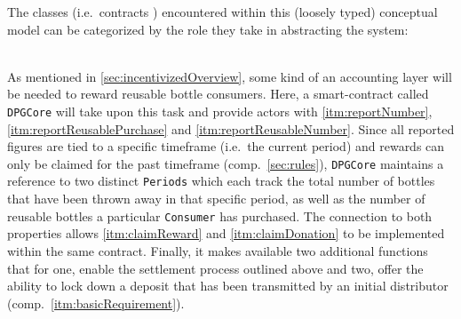 The classes (i.e.~contracts \cite[p.~75]{solidityDocs}) encountered within this (loosely typed) conceptual model can be categorized by the role they take in abstracting the system:

\begin{description}[format={\storedescriptionlabel}]
	\item[Accounting\label{itm:accounting}]
	\hfill \\
	As mentioned in \autoref{sec:incentivizedOverview}, some kind of an accounting layer will be needed to reward reusable bottle consumers. Here, a smart-contract called \texttt{DPGCore} will take upon this task and provide actors with \ref{itm:reportNumber}, \ref{itm:reportReusablePurchase} and \ref{itm:reportReusableNumber}. Since all reported figures are tied to a specific timeframe (i.e.~the current period) and rewards can only be claimed for the past timeframe (comp.~\ref{sec:rules}), \texttt{DPGCore} maintains a reference to two distinct \texttt{Periods} which each track the total number of bottles that have been thrown away in that specific period, as well as the number of reusable bottles a particular \texttt{Consumer} has purchased. The connection to both properties allows \ref{itm:claimReward} and \ref{itm:claimDonation} to be implemented within the same contract. Finally, it makes available two additional functions that for one, enable the settlement process outlined above and two, offer the ability to lock down a deposit that has been transmitted by an initial distributor (comp.~\ref{itm:basicRequirement}). 
	

\end{description}
